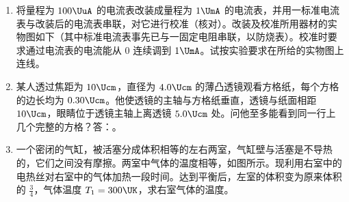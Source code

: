 \documentclass[\gkver]{gaokaozhenti}
\begin{document}
\begin{enumerate}
\item
将量程为 $100\UuA$ 的电流表改装成量程为 $1\UmA$ 的电流表，并用一标准电流表与改装后的电流表串联，对它进行校准（核对）。改装及校准所用器材的实物图如下（其中标准电流表事先已与一固定电阻串联，以防烧表）。校准时要求通过电流表的电流能从 $0$ 连续调到 $1\UmA$。试按实验要求在所给的实物图上连线。



\item
某人透过焦距为 $10\Ucm$，直径为 $4.0\Ucm$ 的薄凸透镜观看方格纸，每个方格的边长均为 $0.30\Ucm$。他使透镜的主轴与方格纸垂直，透镜与纸面相距 $10\Ucm$，眼睛位于透镜主轴上离透镜 $5.0\Ucm$ 处。问他至多能看到同一行上几个完整的方格？答：。



\item
一个密闭的气缸，被活塞分成体积相等的左右两室，气缸壁与活塞是不导热的，它们之间没有摩擦。两室中气体的温度相等，如图所示。现利用右室中的电热丝对右室中的气体加热一段时间。达到平衡后，左室的体积变为原来体积的 $\frac{3}{4}$，气体温度 $T_{1}=300\UK$，求右室气体的温度。


\end{enumerate}
\end{document}
